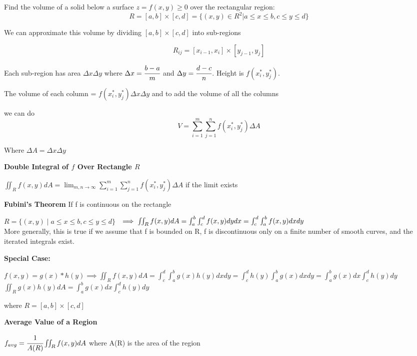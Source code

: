 \documentclass{article}
\begin{document}
Find the volume of a solid below a surface $z=f(x, y) \geq 0$ over the rectangular region:
$$R = [a, b] \times [c, d] = \{ (x, y) \in R^2 | a \leq x \leq b, c \leq y \leq d \}$$

We can approximate this volume by dividing $[a,b] \times [c,d]$ into sub-regions 

$$R_{ij} = [x_{i-1}, x_{i}] \times [y_{j-1}, y_j]$$

Each sub-region has area $\Delta x \Delta y$ where $\Delta x = \cfrac{b-a}{m}$ and $\Delta y = \cfrac{d - c}{n}$. 
Height is $f(x_i^*, y_j^*)$.

The volume of each column = $f(x_i^*, y_j^*)\Delta x \Delta y$ and to add the volume of all the columns

we can do 
$$V = \sum_{i=1}^m \sum_{j=1}^n f(x_i^*, y_j^*) \Delta A$$

Where $\Delta A = \Delta x \Delta y$

\begin{definition}
    \textbf{Double Integral of $f$ Over Rectangle $R$}

    $\iint_{R} f(x, y) dA = \lim_{m,n\to\infty} \sum_{i =1}^m \sum_{j=1}^n f(x_i^*, y_j^*) \Delta A$
    if the limit exists
\end{definition}

\begin{theorem}
    \textbf{Fubini's Theorem}
    If f is continuous on the rectangle 
    
    $R = \{(x, y) \mid a \leq x \leq b, c \leq y \leq d \}$
    $\\ \implies\iint_R f(x, y) dA = \int_a^b \int_c^d f(x, y) dydx = \int_c^d \int_a^b f(x, y) dxdy$\\
    
    More generally, this is true if we assume that f is bounded on R, f is discontinuous only on a finite number of smooth curves, and the iterated integrals exist.
\end{theorem}

\newpage

\textbf{Special Case:}

$f(x, y) = g(x) * h(y)
\implies \iint_R f(x, y) dA = \int_c^d \int_a^b g(x)h(y) dxdy = \int_c^d h(y) \int_a^b g(x) dx dy = \int_a^b g(x) dx \int_c^d h(y) dy$
$\iint_R g(x) h(y) dA = \int_a^b g(x) dx \int_c^d h(y) dy$

where $R = [a, b] \times [c, d]$
\begin{definition}
    \textbf{Average Value of a Region}

    $f_{avg} = \cfrac{1}{A(R)} \iint_R f(x, y) dA$
    where A(R) is the area of the region
\end{definition}
\end{document}
